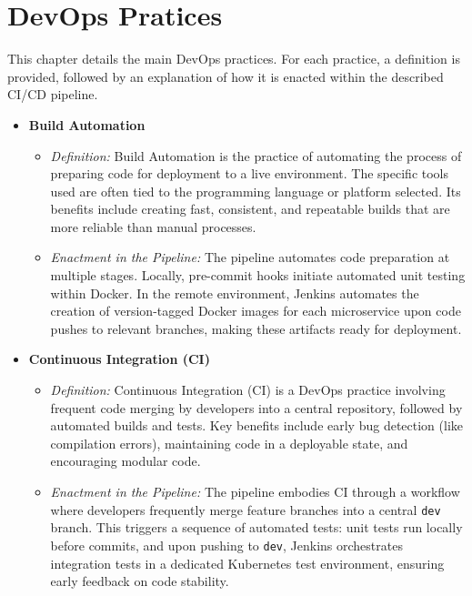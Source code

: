 \chapter{DevOps Pratices}

This chapter details the main DevOps practices. For each practice, a definition is provided, followed by an explanation of how it is enacted within the described CI/CD pipeline.

\begin{itemize}
    \item \textbf{Build Automation}
    \begin{itemize}
        \item \textit{Definition:} Build Automation is the practice of automating the process of preparing code for deployment to a live environment. The specific tools used are often tied to the programming language or platform selected. Its benefits include creating fast, consistent, and repeatable builds that are more reliable than manual processes.
        \item \textit{Enactment in the Pipeline:} The pipeline automates code preparation at multiple stages. Locally, pre-commit hooks initiate automated unit testing within Docker. In the remote environment, Jenkins automates the creation of version-tagged Docker images for each microservice upon code pushes to relevant branches, making these artifacts ready for deployment.
    \end{itemize}

    \item \textbf{Continuous Integration (CI)}
    \begin{itemize}
        \item \textit{Definition:} Continuous Integration (CI) is a DevOps practice involving frequent code merging by developers into a central repository, followed by automated builds and tests. Key benefits include early bug detection (like compilation errors), maintaining code in a deployable state, and encouraging modular code.
        \item \textit{Enactment in the Pipeline:} The pipeline embodies CI through a workflow where developers frequently merge feature branches into a central \texttt{dev} branch. This triggers a sequence of automated tests: unit tests run locally before commits, and upon pushing to \texttt{dev}, Jenkins orchestrates integration tests in a dedicated Kubernetes test environment, ensuring early feedback on code stability.
    \end{itemize}


\end{itemize}
